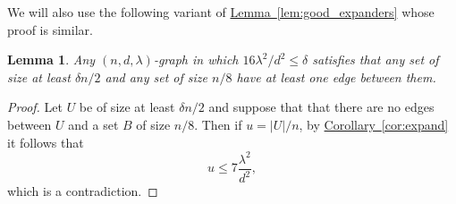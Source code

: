 \documentclass[11pt]{article}
\numberwithin{equation}{section}
\newtheorem{lemma}[theorem]{Lemma}
\theoremstyle{definition}
\theoremstyle{plain}
\newcommand{\expref}[2]{\hyperref[#2]{#1~\ref{#2}}}
\begin{document}
We will also use the following variant of \expref{Lemma}{lem:good_expanders} whose proof is similar. 

\begin{lemma} \label{lem:good_expanders2} 
Any $(n,d,\lambda)$-graph
in which $16 {\lambda^2}/{d^2} \leq \delta$ satisfies that 
%
%
any set of size at least $\delta n / 2$ and any set of size $n/8$ have at least one edge between them.
%
%
%
\end{lemma} 

\begin{proof}
Let $U$ be of size at least $\delta n/2$ and suppose that that there are no edges between 
$U$ and a set $B$ of size $n/8$. Then if $u = |U|/n$, by \expref{Corollary}{cor:expand} it follows that 
\[
u \leq 7 \frac{\lambda^2}{d^2},
\]
which is a contradiction. 

%
%
%
%
%
%
%
%
\end{proof} 
\end{document}
